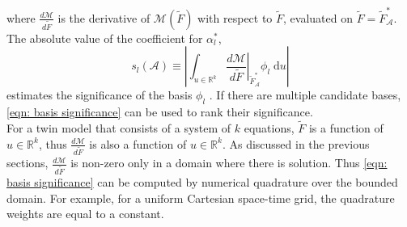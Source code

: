 where $\frac{d\mathcal{M}}{d\tilde{F}}$ is the derivative of $\mathcal{M}(\tilde{F})$ 
with respect to $\tilde{F}$, evaluated on $\tilde{F} = \tilde{F}^*_\mathcal{A}$.
The absolute value of the coefficient for $\alpha_l^*$,
\begin{equation}
    s_l(\mathcal{A}) \equiv \left|\int_{u\in \mathbb{R}^k} \left.\frac{d\mathcal{M}}{d \tilde{F}}
    \right|_{\tilde{F}_\mathcal{A}^*} \phi_l \; \textrm{d} u \right|
    \label{eqn: basis significance}
\end{equation}
estimates the significance of the basis $\phi_l$ \cite{weight selection}. 
If there are multiple candidate bases, \eqref{eqn: basis significance} can be used to rank their 
significance.\\

For a twin model that consists of a system of $k$ equations,
$\tilde{F}$ is a function of $u\in\mathbb{R}^k$, thus 
$\frac{d\mathcal{M}}{d\tilde{F}}$ is also a function of $u\in\mathbb{R}^k$.
As discussed in the previous sections, $\frac{d \mathcal{M}}{d\tilde{F}}$ is non-zero only in a
domain where there is solution. Thus \eqref{eqn: basis significance} 
can be computed by numerical quadrature over the bounded domain.
For example, for a uniform Cartesian space-time grid, the quadrature weights are equal to a constant.
\\

